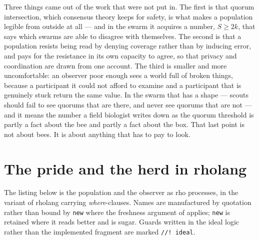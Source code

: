 \documentclass[11pt,a4paper]{article}
\theoremstyle{plain}
\theoremstyle{definition}
\theoremstyle{remark}
\begin{document}
Three things came out of the work that were not put in. The first is that
quorum intersection, which consensus theory keeps for safety, is what makes a
population legible from outside at all --- and in the swarm it acquires a number,
$S \ge 2k$, that says which swarms are able to disagree with themselves. The
second is that a population resists being read by denying coverage rather than
by inducing error, and pays for the resistance in its own capacity to agree, so
that privacy and coordination are drawn from one account. The third is smaller
and more uncomfortable: an observer poor enough sees a world full of broken
things, because a participant it could not afford to examine and a participant
that is genuinely stuck return the same value. In the swarm that has a shape ---
scouts should fail to see quorums that are there, and never see quorums that
are not --- and it means the number a field biologist writes down as the quorum
threshold is partly a fact about the bee and partly a fact about the box. That
last point is not about bees. It is about anything that has to pay to look.

\appendix

\section{The pride and the herd in rholang}\label{app:rholang}

The listing below is the population and the observer as rho processes, in the
variant of rholang carrying \emph{where}-clauses. Names are manufactured by
quotation rather than bound by \texttt{new} where the freshness argument of
\cite[\S3]{scientist} applies; \texttt{new} is retained where it reads better
and is sugar. Guards written in the ideal logic rather than the implemented
fragment are marked \texttt{//! ideal}.
\end{document}
